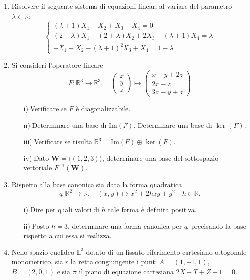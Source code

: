 \documentclass{article}
\theoremstyle{plain}
\theoremstyle{definition}
\theoremstyle{remark}
\begin{document}
\begin{enumerate}
\item
Risolvere il seguente sistema di equazioni lineari al variare del parametro $\lambda \in \mathbb{R}$:
\[
\begin{cases}
(\lambda + 1)X_1 + X_2 + X_3 - X_4 = 0 \\
(2 - \lambda)X_1 + (2 + \lambda)X_2 + 2X_3 - (\lambda + 1)X_4 = \lambda \\
-X_1 - X_2 - (\lambda + 1)^2 X_3 + X_4 = 1 - \lambda
\end{cases}
\]

\item
Si consideri l'operatore lineare 
\[
F : \mathbb{R}^3 \rightarrow \mathbb{R}^3 ,\quad \begin{pmatrix}x\\y\\z\end{pmatrix} \mapsto \begin{pmatrix}x - y + 2z\\2x - z\\3x - y + z\end{pmatrix}
\]
\begin{enumerate}
    \item[i)] Verificare se $F$ è diagonalizzabile.
    \item[ii)] Determinare una base di $\mathrm{Im}(F)$. Determinare una base di $\ker(F)$.
    \item[iii)] Verificare se risulta $\mathbb{R}^3 = \mathrm{Im}(F) \oplus \ker(F)$.
    \item[iv)] Dato $\mathbf{W}=\langle(1,2,3)\rangle$, determinare una base del sottospazio vettoriale $F^{-1}(\mathbf{W})$.
\end{enumerate}

\item
Rispetto alla base canonica sia data la forma quadratica
\[
q : \mathbb{R}^2 \rightarrow \mathbb{R},\quad (x, y) \mapsto x^2 + 2hxy + y^2\quad h\in\mathbb{R}.
\]
\begin{enumerate}
    \item[i)] Dire per quali valori di $h$ tale forma è definita positiva.
    \item[ii)] Posto $h = 3$, determinare una forma canonica per $q$, precisando la base rispetto a cui essa si realizza.
\end{enumerate}

\item
Nello spazio euclideo $\mathbb{E}^3$ dotato di un fissato riferimento cartesiano ortogonale monometrico, sia $r$ la retta congiungente i punti $A = (1, -1, 1)$, $B = (2, 0, 1)$ e sia $\pi$ il piano di equazione cartesiana $2X - T + Z + 1 = 0$.


\end{enumerate}
\end{document}
